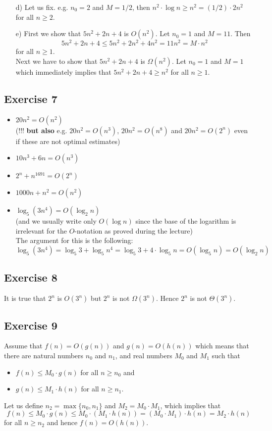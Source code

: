 \documentclass[english]{article}
\begin{document}
\begin{itemize}
\item[d)] Let us fix. e.g. $n_0 = 2$ and $M=1/2$, then
      $n^2\cdot \log n \geq n^2 = (1/2)\cdot 2 n^2$ 
      for all $n \geq 2$.

\item[e)] First we show that $5n^2 + 2n + 4$ is $O(n^2)$.
      Let $n_0=1$ and $M=11$. Then  
  $$5n^2 + 2n +4 \leq 5n^2 + 2n^2 + 4n^2 = 11n^2 =
 M\cdot n^2$$
  for all $n \geq 1$. \\
      Next we have to show that $5n^2 +2n +4$ is
    $\Omega(n^2)$. Let $n_0=1$ and $M = 1$ which immediately
    implies that $5n^2 +2n +4 \geq n^2$ for all $n \geq 1$.

\end{itemize}

\subsection*{Exercise 7}

\begin{itemize}
\item $20n^2 = O(n^2)$ \\
(!!! {\bf but also} e.g. $20n^2 = O(n^3)$, $20n^2 = O(n^8)$ and
  $20n^2 = O(2^n)$ even if these are not optimal estimates)
\item $10n^3 + 6n = O(n^3)$
\item $2^n + n^{1691} = O(2^n)$
\item $1000n + n^2 = O(n^2)$
\item $\log_5(3n^4) = O(\log_2 n)$\\
  (and we usually write only $O(\log n)$
  since the base of the logarithm is irrelevant for the $O$-notation
  as proved during the lecture) \\
  The argument for this is the following:
   $\log_5{(3n^4)} = \log_5{3} + \log_5{n^4} = 
  \log_5{3} + 4\cdot\log_5 n = O(\log_5{n}) = O(\log_2{n})$
\end{itemize}

\subsection*{Exercise 8} 

It is true that $2^n$ is $O(3^n)$ but $2^n$ is not $\Omega(3^n)$.
Hence $2^n$ is not $\Theta(3^n)$. \\

\subsection*{Exercise 9}

Assume that $f(n)=O(g(n))$ and $g(n)=O(h(n))$ which means that
there are natural numbers $n_0$ and $n_1$, and real numbers
$M_0$ and $M_1$ such that 
\begin{itemize}
\item
$f(n) \leq M_0\cdot g(n)$ for all $n \geq n_0$ and
\item
$g(n) \leq M_1\cdot h(n)$ for all $n \geq n_1$.
\end{itemize}
Let us define $n_2 = \max\{n_0,n_1\}$ and $M_2=M_0\cdot M_1$,
which implies that
$$f(n) \leq M_0\cdot g(n) \leq M_0\cdot ( M_1\cdot h(n)) =
(M_0\cdot M_1)\cdot h(n) = M_2\cdot h(n)$$ for all
$n \geq n_2$ and hence $f(n)=O(h(n))$.
\end{document}
